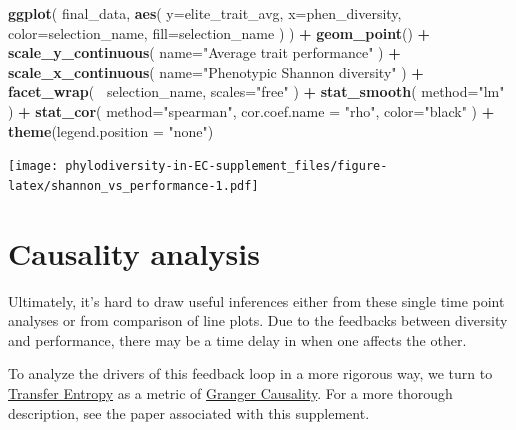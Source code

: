 \documentclass[]{book}
\newenvironment{Shaded}{\begin{snugshade}}{\end{snugshade}}
\newcommand{\DataTypeTok}[1]{\textcolor[rgb]{0.13,0.29,0.53}{#1}}
\newcommand{\KeywordTok}[1]{\textcolor[rgb]{0.13,0.29,0.53}{\textbf{#1}}}
\newcommand{\NormalTok}[1]{#1}
\newcommand{\OperatorTok}[1]{\textcolor[rgb]{0.81,0.36,0.00}{\textbf{#1}}}
\newcommand{\StringTok}[1]{\textcolor[rgb]{0.31,0.60,0.02}{#1}}
\begin{document}
\begin{Shaded}
\begin{Highlighting}[]
\KeywordTok{ggplot}\NormalTok{(}
\NormalTok{    final_data,}
    \KeywordTok{aes}\NormalTok{(}
        \DataTypeTok{y=}\NormalTok{elite_trait_avg,}
        \DataTypeTok{x=}\NormalTok{phen_diversity,}
        \DataTypeTok{color=}\NormalTok{selection_name,}
        \DataTypeTok{fill=}\NormalTok{selection_name}
\NormalTok{    )}
\NormalTok{  ) }\OperatorTok{+}
\StringTok{  }\KeywordTok{geom_point}\NormalTok{() }\OperatorTok{+}
\StringTok{    }\KeywordTok{scale_y_continuous}\NormalTok{(}
        \DataTypeTok{name=}\StringTok{"Average trait performance"}
\NormalTok{  ) }\OperatorTok{+}
\StringTok{  }\KeywordTok{scale_x_continuous}\NormalTok{(}
        \DataTypeTok{name=}\StringTok{"Phenotypic Shannon diversity"}
\NormalTok{  ) }\OperatorTok{+}\StringTok{ }
\StringTok{  }\KeywordTok{facet_wrap}\NormalTok{(}
      \OperatorTok{~}\NormalTok{selection_name, }\DataTypeTok{scales=}\StringTok{"free"}
\NormalTok{  ) }\OperatorTok{+}\StringTok{ }
\StringTok{  }\KeywordTok{stat_smooth}\NormalTok{(}
    \DataTypeTok{method=}\StringTok{"lm"}
\NormalTok{  ) }\OperatorTok{+}\StringTok{ }
\StringTok{  }\KeywordTok{stat_cor}\NormalTok{(}
    \DataTypeTok{method=}\StringTok{"spearman"}\NormalTok{, }\DataTypeTok{cor.coef.name =} \StringTok{"rho"}\NormalTok{, }\DataTypeTok{color=}\StringTok{"black"}
\NormalTok{  ) }\OperatorTok{+}
\StringTok{  }\KeywordTok{theme}\NormalTok{(}\DataTypeTok{legend.position =} \StringTok{"none"}\NormalTok{)}
\end{Highlighting}
\end{Shaded}

\texttt{[image: phylodiversity-in-EC-supplement\_files/figure-latex/shannon\_vs\_performance-1.pdf]}

\hypertarget{causality-analysis}{%
\section{Causality analysis}\label{causality-analysis}}

Ultimately, it's hard to draw useful inferences either from these single time point analyses or from comparison of line plots. Due to the feedbacks between diversity and performance, there may be a time delay in when one affects the other.

To analyze the drivers of this feedback loop in a more rigorous way, we turn to \href{https://towardsdatascience.com/causality-931372313a1c}{Transfer Entropy} as a metric of \href{http://www.scholarpedia.org/article/Granger_causality}{Granger Causality}. For a more thorough description, see the paper associated with this supplement.
\end{document}
